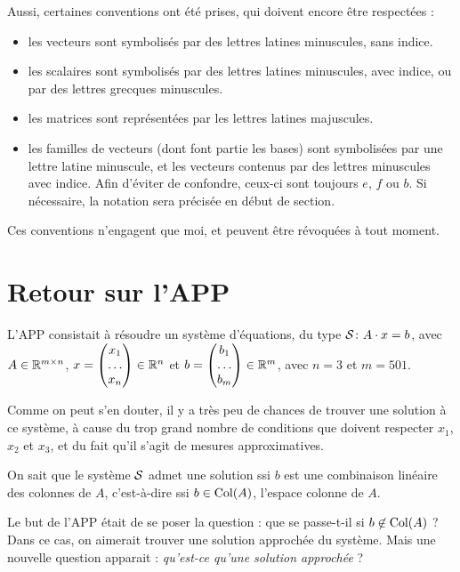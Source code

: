 Aussi, certaines conventions ont été prises, qui doivent encore être respectées :
\begin{itemize}
\item les vecteurs sont symbolisés par des lettres latines minuscules, sans indice.
\item les scalaires sont symbolisés par des lettres latines minuscules, avec indice, ou par des lettres grecques minuscules.
\item les matrices sont représentées par les lettres latines majuscules.
\item les familles de vecteurs (dont font partie les bases) sont symbolisées par une lettre latine minuscule, et les vecteurs contenus par des lettres minuscules avec indice. Afin d'éviter de confondre, ceux-ci sont toujours $e$, $f$ ou $b$. Si nécessaire, la notation sera précisée en début de section.
\end{itemize}
Ces conventions n'engagent que moi, et peuvent être révoquées à tout moment.

\section{Retour sur l'APP}

L'APP consistait à résoudre un système d'équations, du type $\mathcal{S} \colon A \cdot x = b$, 
avec $A \in \mathbb{R}^{m \times n}$, 
$x = \begin{pmatrix} x_1 \\ \ldots \\ x_n \end{pmatrix} \in \mathbb{R}^{n}$ et 
$b = \begin{pmatrix} b_1 \\ \ldots \\ b_m \end{pmatrix} \in \mathbb{R}^{m}$, avec $n=3$ et $m=501$.

Comme on peut s'en douter, il y a très peu de chances de trouver une solution à ce système, à cause du trop grand nombre de conditions que doivent respecter $x_1$, $x_2$ et $x_3$, et du fait qu'il s'agit de mesures approximatives.

On sait que le système $\mathcal{S}$ admet une solution ssi $b$ est une combinaison linéaire des colonnes de $A$, c'est-à-dire ssi $b \in \mathrm{Col}(A)$, l'espace colonne de $A$.

Le but de l'APP était de se poser la question : que se passe-t-il si $b \not \in \mathrm{Col}(A)$ ? Dans ce cas, on aimerait trouver une solution approchée du système. Mais une nouvelle question apparait : \emph{qu'est-ce qu'une solution approchée} ?


